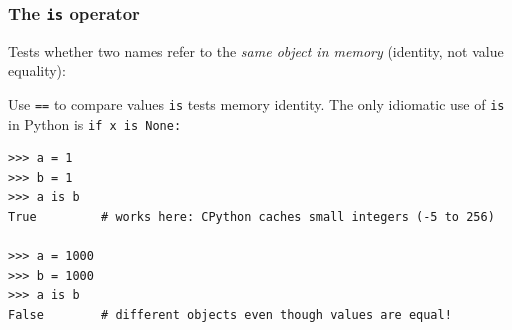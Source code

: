 \begin{frame}[fragile]  \frametitle{The \texttt{is} operator}
Tests whether two names refer to the \emph{same object in memory} (identity, not value equality):
\begin{alertblock}{Use \texttt{==} to compare values}
\texttt{is} tests memory identity. The only idiomatic use of \texttt{is} in Python is \lstinline|if x is None:|
\end{alertblock}
\begin{lstlisting}
>>> a = 1
>>> b = 1
>>> a is b
True         # works here: CPython caches small integers (-5 to 256)

>>> a = 1000
>>> b = 1000
>>> a is b
False        # different objects even though values are equal!
\end{lstlisting}
\end{frame}





